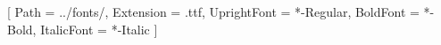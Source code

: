 
\usepackage{geometry}
\geometry{
  top=25mm, bottom=25mm,
  inner=23mm, outer=45mm
}

\usepackage{lineno}
\linenumbers
\renewcommand\linenumberfont{\normalfont\tiny\color{gray}}

\usepackage[firstpageonly]{draftwatermark}

\usepackage{fontspec}
\setmainfont{Cormorant Garamond}[
  Path = ../fonts/,
  Extension = .ttf,
  UprightFont = *-Regular,
  BoldFont = *-Bold,
  ItalicFont = *-Italic
]
\usepackage{microtype}
\usepackage[none]{hyphenat} %

\usepackage{titling}

\setlength{\droptitle}{0.2\textheight}

